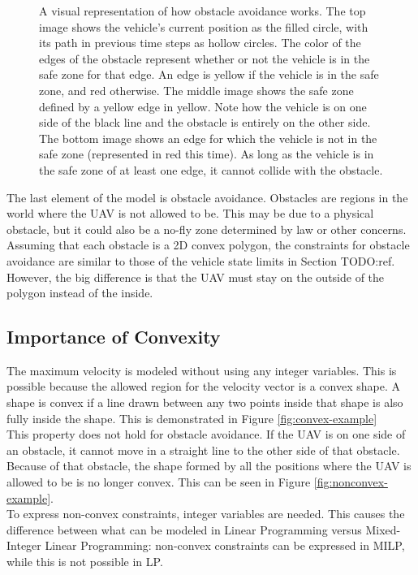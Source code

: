 \begin{figure}[!t]
\begin{subfigure}[t]{0.47\textwidth}
        \caption{}
    \end{subfigure}
    \caption{A visual representation of how obstacle avoidance works. The top image shows the vehicle's current position as the filled circle, with its path in previous time steps as hollow circles. The color of the edges of the obstacle represent whether or not the vehicle is in the safe zone for that edge. An edge is yellow if the vehicle is in the safe zone, and red otherwise. The middle image shows the safe zone defined by a yellow edge in yellow. Note how the vehicle is on one side of the black line and the obstacle is entirely on the other side. The bottom image shows an edge for which the vehicle is not in the safe zone (represented in red this time). As long as the vehicle is in the safe zone of at least one edge, it cannot collide with the obstacle.}\label{fig:obs}
\end{figure}
The last element of the model is obstacle avoidance. Obstacles are regions in the world where the UAV is not allowed to be. This may be due to a physical obstacle, but it could also be a no-fly zone determined by law or other concerns. \\
Assuming that each obstacle is a 2D convex polygon, the constraints for obstacle avoidance are similar to those of the vehicle state limits in Section TODO:ref. However, the big difference is that the UAV must stay on the outside of the polygon instead of the inside. \\
\subsection{Importance of Convexity}
The maximum velocity is modeled without using any integer variables. This is possible because the allowed region for the velocity vector is a convex shape. A shape is convex if a line drawn between any two points inside that shape is also fully inside the shape. This is demonstrated in Figure \ref{fig:convex-example}\\
This property does not hold for obstacle avoidance. If the UAV is on one side of an obstacle, it cannot move in a straight line to the other side of that obstacle. Because of that obstacle, the shape formed by all the positions where the UAV is allowed to be is no longer convex. This can be seen in Figure \ref{fig:nonconvex-example}. \\
To express non-convex constraints, integer variables are needed. This causes the difference between what can be modeled in Linear Programming versus Mixed-Integer Linear Programming: non-convex constraints can be expressed in MILP, while this is not possible in LP.


